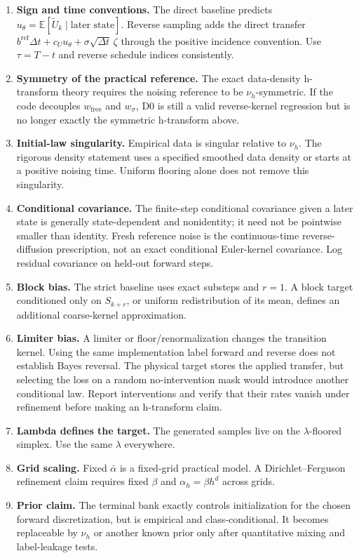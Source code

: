 \documentclass[11pt]{article}
\numberwithin{equation}{section}
\newcommand{\E}{\mathbb E}
\newcommand{\1}{\mathbf 1}
\begin{document}
\begin{enumerate}[leftmargin=2.0em]
  \item \textbf{Sign and time conventions.}  The direct baseline predicts \(u_\theta=\E[\widetilde U_k\mid\text{later state}]\).  Reverse sampling adds the direct transfer \(b^{\mathrm{ref}}\Delta t+c_Uu_\theta+\sigma\sqrt{\Delta t}\,\zeta\) through the positive incidence convention.  Use \(\tau=T-t\) and reverse schedule indices consistently.
  \item \textbf{Symmetry of the practical reference.}  The exact data-density h-transform theory requires the noising reference to be \(\nu_h\)-symmetric.  If the code decouples \(w_{\mathrm{free}}\) and \(w_\sigma\), D0 is still a valid reverse-kernel regression but is no longer exactly the symmetric h-transform above.
  \item \textbf{Initial-law singularity.}  Empirical data is singular relative to \(\nu_h\).  The rigorous density statement uses a specified smoothed data density or starts at a positive noising time.  Uniform flooring alone does not remove this singularity.
  \item \textbf{Conditional covariance.}  The finite-step conditional covariance given a later state is generally state-dependent and nonidentity; it need not be pointwise smaller than identity.  Fresh reference noise is the continuous-time reverse-diffusion prescription, not an exact conditional Euler-kernel covariance.  Log residual covariance on held-out forward steps.
  \item \textbf{Block bias.}  The strict baseline uses exact substeps and \(r=1\).  A block target conditioned only on \(S_{k+r}\), or uniform redistribution of its mean, defines an additional coarse-kernel approximation.
  \item \textbf{Limiter bias.}  A limiter or floor/renormalization changes the transition kernel.  Using the same implementation label forward and reverse does not establish Bayes reversal.  The physical target stores the applied transfer, but selecting the loss on a random no-intervention mask would introduce another conditional law.  Report interventions and verify that their rates vanish under refinement before making an h-transform claim.
  \item \textbf{Lambda defines the target.}  The generated samples live on the \(\lambda\)-floored simplex.  Use the same \(\lambda\) everywhere.
  \item \textbf{Grid scaling.}  Fixed \(\bar\alpha\) is a fixed-grid practical model.  A Dirichlet--Ferguson refinement claim requires fixed \(\beta\) and \(\alpha_h=\beta h^d\) across grids.
  \item \textbf{Prior claim.}  The terminal bank exactly controls initialization for the chosen forward discretization, but is empirical and class-conditional.  It becomes replaceable by \(\nu_h\) or another known prior only after quantitative mixing and label-leakage tests.
\end{enumerate}
\end{document}
